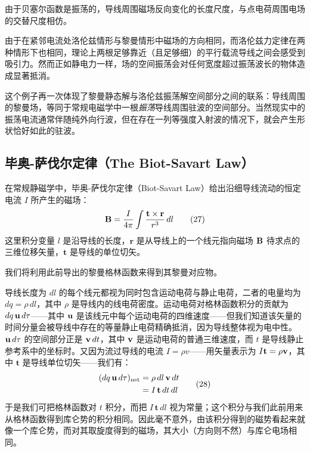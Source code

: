 由于贝塞尔函数是振荡的，导线周围磁场反向变化的长度尺度，与点电荷周围电场的交替尺度相仿。


由于在紧邻电流处洛伦兹情形与黎曼情形中磁场的方向相同，而洛伦兹力定律在两种情形下也相同，理论上两根足够靠近（且足够细）的平行载流导线之间会感受到吸引力。然而正如静电力一样，场的空间振荡会对任何宽度超过振荡波长的物体造成显著抵消。

这个例子再一次体现了黎曼静态解与洛伦兹振荡解空间部分之间的联系：导线周围的黎曼场，等同于常规电磁学中一根\emph{振荡}导线周围驻波的空间部分。当然现实中的振荡电流通常伴随纯外向行波，但在存在一列等强度入射波的情况下，就会产生形状恰好如此的驻波。

\subsection{毕奥-萨伐尔定律（The Biot-Savart Law）}

在常规静磁学中，毕奥-萨伐尔定律（Biot-Savart Law）给出沿细导线流动的恒定电流 $I$ 所产生的磁场：
\begin{equation}
\mathbf{B} = \frac{I}{4\pi}\int \frac{\mathbf{t} \times \mathbf{r}}{r^3}\,dl \tag{27}
\end{equation}
这里积分变量 $l$ 是沿导线的长度，$\mathbf{r}$ 是从导线上的一个线元指向磁场 $\mathbf{B}$ 待求点的三维位移矢量，$\mathbf{t}$ 是导线的单位切矢。

我们将利用此前导出的黎曼格林函数来得到其黎曼对应物。

导线长度为 $dl$ 的每个线元都视为同时包含运动电荷与静止电荷，二者的电量均为 $dq = \rho\,dl$，其中 $\rho$ 是导线内的线电荷密度。运动电荷对格林函数积分的贡献为 $dq\,\mathbf{u}\,d\tau$——其中 $\mathbf{u}$ 是该线元中每个运动电荷的四维速度——但我们知道该矢量的时间分量会被导线中存在的等量静止电荷精确抵消，因为导线整体视为电中性。$\mathbf{u}\,d\tau$ 的空间部分正是 $\mathbf{v}\,dt$，其中 $\mathbf{v}$ 是运动电荷的普通三维速度，而 $t$ 是导线静止参考系中的坐标时。又因为流过导线的电流 $I = \rho v$——用矢量表示为 $I\mathbf{t} = \rho\mathbf{v}$，其中 $\mathbf{t}$ 是导线单位切矢——我们有：
\begin{equation}
\begin{aligned}
(dq\,\mathbf{u}\,d\tau)_{\text{net}} &= \rho\,dl\,\mathbf{v}\,dt \\
 &= I\,\mathbf{t}\,dt\,dl
\end{aligned}
\tag{28}
\end{equation}
于是我们可把格林函数对 $t$ 积分，而把 $I\,\mathbf{t}\,dl$ 视为常量；这个积分与我们此前用来从格林函数得到库仑势的积分相同。因此毫不意外，由该积分得到的磁势看起来就像一个库仑势，而对其取旋度得到的磁场，其大小（方向则不然）与库仑电场相同。

